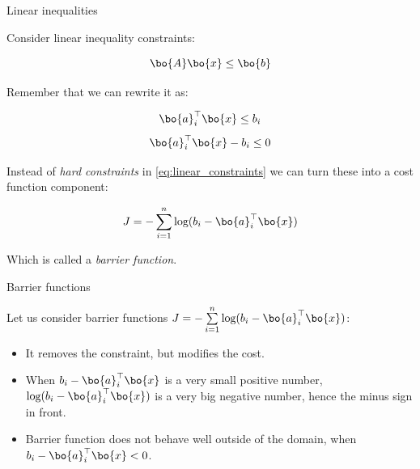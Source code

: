 \documentclass{beamer}
\begin{document}
\begin{frame}{Linear inequalities}
\begin{flushleft}

Consider linear inequality constraints:

\begin{equation}
    \bo{A}\bo{x} \leq \bo{b}
\end{equation}

Remember that we can rewrite it as:

\begin{equation}
    \bo{a}_i^\top \bo{x} \leq b_i
\end{equation}
\begin{equation}
\label{eq:linear_constraints}
    \bo{a}_i^\top \bo{x} - b_i \leq 0
\end{equation}

Instead of \emph{hard constraints} in \eqref{eq:linear_constraints} we can turn these into a cost function component:

\begin{equation}
    J = -\sum\limits_{i = 1}^n \text{log} (b_i - \bo{a}_i^\top \bo{x})
\end{equation}

Which is called a \emph{barrier function}.
 
\end{flushleft}
\end{frame}




\begin{frame}{Barrier functions}
\begin{flushleft}

Let us consider barrier functions $J = -\sum\limits_{i = 1}^n \text{log} (b_i - \bo{a}_i^\top \bo{x})$:

\begin{itemize}
    \item It removes the constraint, but modifies the cost.
    \item When $b_i - \bo{a}_i^\top \bo{x}$ is a very small positive number, $\text{log} (b_i - \bo{a}_i^\top \bo{x})$ is a very big negative number, hence the minus sign in front.
    \item Barrier function does not behave well outside of the domain, when $b_i - \bo{a}_i^\top \bo{x} < 0$.
\end{itemize}
 
\end{flushleft}
\end{frame}
\end{document}
